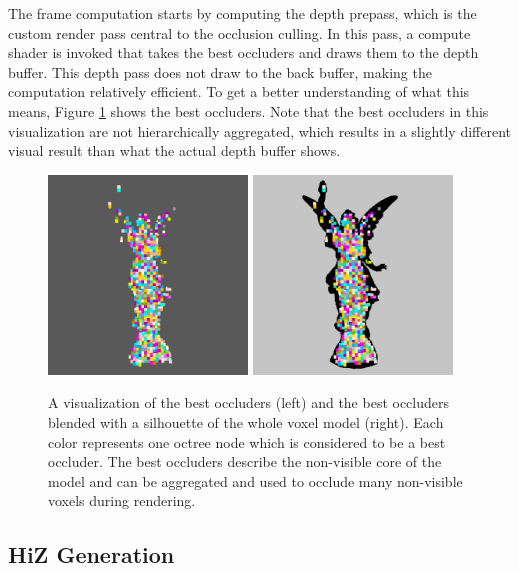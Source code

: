 The frame computation starts by computing the depth prepass, which is the custom render pass central 
to the occlusion culling. In this pass, a compute shader is invoked that takes the best occluders and 
draws them to the depth buffer. This depth pass does not draw to the back buffer, making the computation 
relatively efficient. To get a better understanding of what this means, Figure \ref{fig:best-occluder-viz} 
shows the best occluders. Note that the best occluders in this visualization are not hierarchically 
aggregated, which results in a slightly different visual result than what the actual depth buffer shows. 

\begin{figure}[h]
    \centering
    \includegraphics[width=200px]{images/graphics/lucy-best-occluders-viz.jpg}
    \includegraphics[width=200px]{images/graphics/lucy-best-occluders-diff-viz.jpg}
    \caption{A visualization of the best occluders (left) and the best occluders blended with a silhouette 
    of the whole voxel model (right). Each color represents one octree node which is considered to be a best occluder.
    The best occluders describe the non-visible core of the model and can be aggregated and used to occlude 
    many non-visible voxels during rendering.}
    \label{fig:best-occluder-viz}
\end{figure}


\subsection*{HiZ Generation} \label{subsec-highz-generation}


